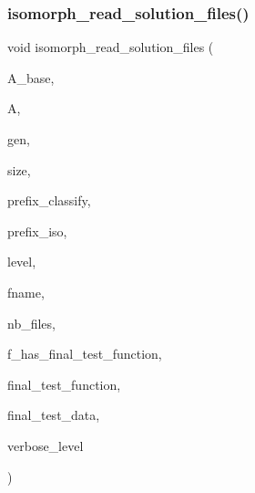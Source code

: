\subsubsection{\texorpdfstring{isomorph\+\_\+read\+\_\+solution\+\_\+files()}{isomorph\_read\_solution\_files()}}
{\footnotesize\ttfamily void isomorph\+\_\+read\+\_\+solution\+\_\+files (\begin{DoxyParamCaption}\item[{\mbox{\hyperlink{classaction}{action}} $\ast$}]{A\+\_\+base,  }\item[{\mbox{\hyperlink{classaction}{action}} $\ast$}]{A,  }\item[{\mbox{\hyperlink{classgenerator}{generator}} $\ast$}]{gen,  }\item[{\mbox{\hyperlink{galois_8h_a09fddde158a3a20bd2dcadb609de11dc}{I\+NT}}}]{size,  }\item[{const \mbox{\hyperlink{galois_8h_ab6cc7b4aeb6ea31aba2b3fbfc83ff5e6}{B\+Y\+TE}} $\ast$}]{prefix\+\_\+classify,  }\item[{const \mbox{\hyperlink{galois_8h_ab6cc7b4aeb6ea31aba2b3fbfc83ff5e6}{B\+Y\+TE}} $\ast$}]{prefix\+\_\+iso,  }\item[{\mbox{\hyperlink{galois_8h_a09fddde158a3a20bd2dcadb609de11dc}{I\+NT}}}]{level,  }\item[{const \mbox{\hyperlink{galois_8h_ab6cc7b4aeb6ea31aba2b3fbfc83ff5e6}{B\+Y\+TE}} $\ast$$\ast$}]{fname,  }\item[{\mbox{\hyperlink{galois_8h_a09fddde158a3a20bd2dcadb609de11dc}{I\+NT}}}]{nb\+\_\+files,  }\item[{\mbox{\hyperlink{galois_8h_a09fddde158a3a20bd2dcadb609de11dc}{I\+NT}}}]{f\+\_\+has\+\_\+final\+\_\+test\+\_\+function,  }\item[{\mbox{\hyperlink{galois_8h_a09fddde158a3a20bd2dcadb609de11dc}{I\+NT}}($\ast$)(\mbox{\hyperlink{galois_8h_a09fddde158a3a20bd2dcadb609de11dc}{I\+NT}} $\ast$data, \mbox{\hyperlink{galois_8h_a09fddde158a3a20bd2dcadb609de11dc}{I\+NT}} sz, void $\ast$final\+\_\+test\+\_\+data, \mbox{\hyperlink{galois_8h_a09fddde158a3a20bd2dcadb609de11dc}{I\+NT}} \mbox{\hyperlink{simeon_8_c_a818073fbcc2f439e7c56952f67386122}{verbose\+\_\+level}})}]{final\+\_\+test\+\_\+function,  }\item[{void $\ast$}]{final\+\_\+test\+\_\+data,  }\item[{\mbox{\hyperlink{galois_8h_a09fddde158a3a20bd2dcadb609de11dc}{I\+NT}}}]{verbose\+\_\+level }\end{DoxyParamCaption})}

\mbox{\label{isomorph__global_8_c_ad8be067333430bfdd26c0a34549f4556}} 

